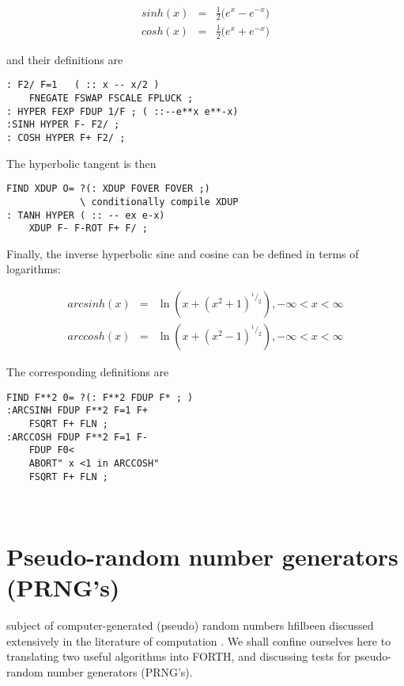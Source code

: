 \begin{eqnarray*}
    sinh(x) & = & \frac{1}{2}\Big(e^x-e^{-x}\Big)\label{hyp_eqn} \\
    cosh(x) & = & \frac{1}{2}\Big(e^x+e^{-x}\Big) 
\end{eqnarray*}


and their definitions are
\begin{verbatim}
: F2/ F=1   ( :: x -- x/2 ) 
    FNEGATE FSWAP FSCALE FPLUCK ;
: HYPER FEXP FDUP 1/F ; ( ::--e**x e**-x)
:SINH HYPER F- F2/ ;
: COSH HYPER F+ F2/ ;
\end{verbatim}

The hyperbolic tangent is then

\begin{verbatim}
FIND XDUP O= ?(: XDUP FOVER FOVER ;)
             \ conditionally compile XDUP
: TANH HYPER ( :: -- ex e-x)
    XDUP F- F-ROT F+ F/ ;
\end{verbatim}

Finally, the inverse hyperbolic sine and cosine can be defined in
terms of logarithms:

\begin{eqnarray*}
    arcsinh(x) & = & \ln{(x + (x^2 + 1)^{^1/_2})} , -\infty < x < \infty \\
    arccosh(x) & = & \ln{(x + (x^2 - 1)^{^1/_2})} , -\infty < x < \infty
\end{eqnarray*}

The corresponding definitions are 


\begin{verbatim}
FIND F**2 0= ?(: F**2 FDUP F* ; )
:ARCSINH FDUP F**2 F=1 F+
    FSQRT F+ FLN ;
:ARCCOSH FDUP F**2 F=1 F-
    FDUP F0<
    ABORT" x <1 in ARCCOSH"
    FSQRT F+ FLN ;

 
\end{verbatim}




\section{Pseudo-random number generators (PRNG's)}
 subject of computer-generated (pseudo) random numbers
hfilbeen discussed extensively in the literature of computation 
  . We shall
confine ourselves here to translating two useful
algorithms into FORTH, and discussing tests for pseudo-random
number generators (PRNG’s).

